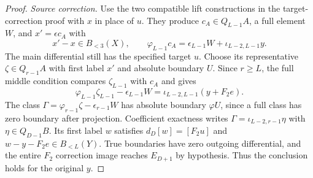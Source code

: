 \begin{proof}
\textit{Source correction.}
Use the two compatible lift constructions in the target-correction proof with
$x$ in place of $u$. They produce $c_A\in Q_{L-1}A$, a full element
$W$, and $x'=\epsilon c_A$ with
\[
x'-x\in B_{<3}(X),\qquad
\varphi_{L-1}c_A=\epsilon_{L-1}W+\iota_{L-2,L-1}y.
\]
The main differential still has the specified target $u$. Choose its
representative $\zeta\in Q_{r-1}A$ with first label $x'$ and absolute
boundary $U$. Since $r\ge L$, the full middle condition compares
$\zeta_{L-1}$ with $c_A$ and gives
\[
\varphi_{L-1}\zeta_{L-1}-\epsilon_{L-1}W
 =\iota_{L-2,L-1}(y+F_2e).
\]
The class $\Gamma=\varphi_{r-1}\zeta-\epsilon_{r-1}W$ has absolute
boundary $\varphi U$, since a full class has zero boundary after
projection. Coefficient exactness writes
$\Gamma=\iota_{L-2,r-1}\eta$ with $\eta\in Q_{D-1}B$.
Its first label $w$ satisfies $d_D[w]=[F_2u]$ and
$w-y-F_2e\in B_{<L}(Y)$. True boundaries have zero outgoing
differential, and the entire $F_2$ correction image reaches $E_{D+1}$
by hypothesis. Thus the conclusion holds for the original $y$.
\end{proof}


